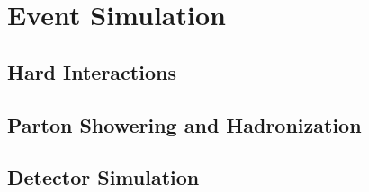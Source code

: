 \section{Event Simulation}\label{sec:event_sim}

\subsection{Hard Interactions}\label{subsec:hard_inter}

\subsection{Parton Showering and Hadronization}\label{subsec:hadronize}

\subsection{Detector Simulation}\label{subsec:detect_sim}